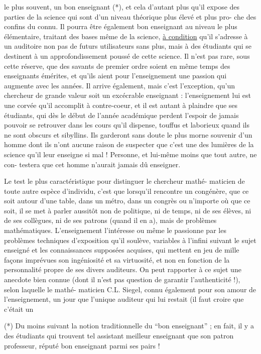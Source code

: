 
le plus souvent, un bon enseignant (*), et cela d'autant plus qu'il expose des
parties de la science qui sont d'un niveau théorique plus élevé et plus pro-%
che des confins du connu. Il pourra être également bon enseignant au niveau
le plus élémentaire, traitant des bases même de la science, \uline{à condition}
qu'il s'adresse à un auditoire non pas de futurs utilisateurs sans plus,
mais à des étudiants qui se destinent à un approfondissement poussé de cette
science. Il n'est pas rare, sous cette réserve, que des savants de premier
ordre soient en même temps des enseignants émérites, et qu'ils aient pour
l'enseignement une passion qui augmente avec les années. Il arrive également,
mais c'est l'exception, qu'un chercheur de grande valeur soit un excécrable
enseignant : l'enseignement lui est une corvée qu'il accomplit à contre-coeur,
et il est autant à plaindre que ses étudiants, qui dès le début de l'année
académique perdent l'espoir de jamais pouvoir se retrouver dans les cours
qu'il dispense, touffus et laborieux quand ils ne sont obscurs et sibyllins.
Ils garderont sans doute le plus morne souvenir d'un homme dont ils n'ont
aucune raison de suspecter que c'est une des lumières de la science qu'il
leur enseigne si mal ! Personne, et lui-même moins que tout autre, ne con-%
testera que cet homme n'aurait jamais dû enseigner.

Le test le plus caractéristique pour distinguer le chercheur mathé-%
maticien de toute autre espèce d'individu, c'est que lorsqu'il rencontre
un congénère, que ce soit autour d'une table, dans un métro, dans un congrès
ou n'importe où que ce soit, il se met à parler aussitôt non de politique,
ni de temps, ni de ses élèves, ni de ses collègues, ni de ses patrons (quand
il en a), mais de problèmes mathématiques. L'enseignement l'intéresse ou
même le passionne par les problèmes techniques d'exposition qu'il soulève,
variables à l'infini suivant le sujet enseigné et les connaissances supposées
acquises, qui mettent en jeu de mille façons imprévues son ingéniosité et
sa virtuosité, et non en fonction de la personnalité propre de ses divers
auditeurs. On peut rapporter à ce sujet une anecdote bien connue (dont il
n'est pas question de garantir l'authenticité !), selon laquelle le mathé-%
maticien C.L. Siegel, connu également pour son amour de l'enseignement,
un jour que l'unique auditeur qui lui restait (il faut croire que c'était un

(*) Du moins suivant la notion traditionnelle du ``bon enseignant'' ; en fait, il
y a des étudiants qui trouvent tel assistant meilleur enseignant que son
patron professeur, réputé bon enseignant parmi ses pairs !

